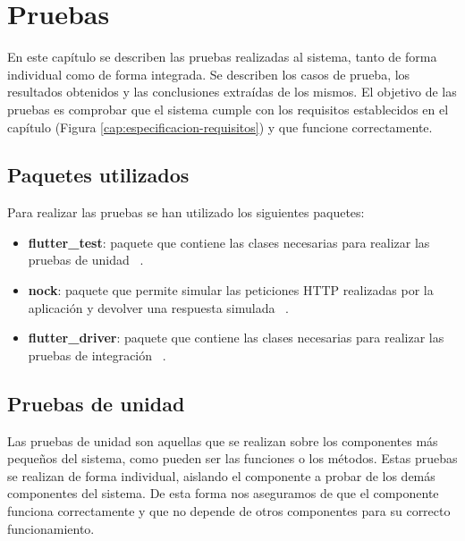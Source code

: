 \chapter{Pruebas}
\label{cap:pruebas}
En este capítulo se describen las pruebas realizadas al sistema, tanto de forma individual como de forma integrada. Se describen los casos de prueba, los resultados obtenidos y las conclusiones extraídas de los mismos.
El objetivo de las pruebas es comprobar que el sistema cumple con los requisitos establecidos en el capítulo (Figura \ref{cap:especificacion-requisitos}) y que funcione correctamente.

\section{Paquetes utilizados}
\label{sec:paquetes-utilizados}
Para realizar las pruebas se han utilizado los siguientes paquetes:

\begin{itemize}
    \item \textbf{flutter\_test}: paquete que contiene las clases necesarias para realizar las pruebas de unidad ~\cite{fluttertest}.
    \item \textbf{nock}: paquete que permite simular las peticiones HTTP realizadas por la aplicación y devolver una respuesta simulada ~\cite{nockpackage}. 
    \item \textbf{flutter\_driver}: paquete que contiene las clases necesarias para realizar las pruebas de integración ~\cite{flutterdriver}. 
\end{itemize}


\section{Pruebas de unidad}
\label{sec:pruebas-unidad}
Las pruebas de unidad son aquellas que se realizan sobre los componentes más pequeños del sistema, como pueden ser las funciones o los métodos. Estas pruebas se realizan de forma individual, aislando el componente a probar de los demás componentes del sistema. 
De esta forma nos aseguramos de que el componente funciona correctamente y que no depende de otros componentes para su correcto funcionamiento.
\newpage




